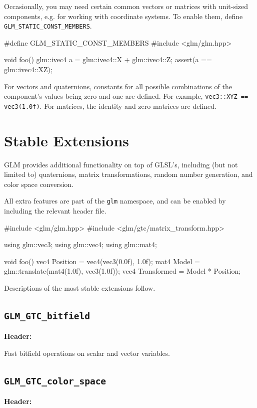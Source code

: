 \documentclass{scrartcl}
\numberwithin{figure}{subsection}
\begin{document}
Occasionally, you may need certain common vectors or matrices with unit-sized components, e.g. for working with coordinate systems.  To enable them, define \verb|GLM_STATIC_CONST_MEMBERS|.

\begin{cppcode}
#define GLM_STATIC_CONST_MEMBERS
#include <glm/glm.hpp>

void foo()
{
  glm::ivec4 a = glm::ivec4::X + glm::ivec4::Z;
  assert(a == glm::ivec4::XZ);
}
\end{cppcode}

For vectors and quaternions, constants for all possible combinations of the component's values being zero and one are defined.  For example, \verb|vec3::XYZ == vec3(1.0f)|.  For matrices, the identity and zero matrices are defined.

\newpage{}

\section{Stable Extensions}

GLM provides additional functionality on top of GLSL's, including (but not limited to) quaternions, matrix transformations, random number generation, and color space conversion.   

All extra features are part of the \verb|glm| namespace, and can be enabled by including the relevant header file.

\begin{cppcode}
#include <glm/glm.hpp>
#include <glm/gtc/matrix_transform.hpp>

using glm::vec3;
using glm::vec4;
using glm::mat4;

void foo()
{
  vec4 Position = vec4(vec3(0.0f), 1.0f);
  mat4 Model = glm::translate(mat4(1.0f), vec3(1.0f));
  vec4 Transformed = Model * Position;
}
\end{cppcode}

Descriptions of the most stable extensions follow.

\subsection{\texttt{GLM\_GTC\_bitfield}}
\textbf{Header:} 

Fast bitfield operations on scalar and vector variables.

\subsection{\texttt{GLM\_GTC\_color\_space}}
\textbf{Header:} 
\end{document}
